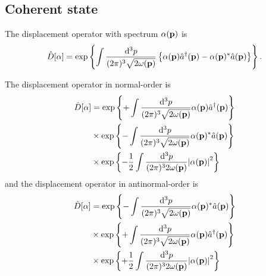 \subsection{Coherent state}

\begin{definition}
	The displacement operator with spectrum $\alpha(\vb{p})$ is
	\begin{equation}
		\hat{D}[\alpha]
		=
		\exp\left\{
			\int\frac{\dd[3]{p}}{(2\pi)^3\sqrt{2\omega(\vb{p})}}
			\left\{
				\alpha(\vb{p})
				\hat{a}^\dagger(\vb{p})
				-
				\alpha(\vb{p})^*
				\hat{a}(\vb{p})
			\right\}
		\right\}
		\label{eq:displacement_operator}
		.
	\end{equation}
\end{definition}
\begin{lemma}\label{thm:displacement_operator_normal_ordered}
	The displacement operator in normal-order is
	\begin{equation}
		\begin{split}
			\hat{D}[\alpha]
			&=
			\exp\left\{
				+
				\int\frac{\dd[3]{p}}{(2\pi)^3\sqrt{2\omega(\vb{p})}}
				\alpha(\vb{p})
				\hat{a}^\dagger(\vb{p})
			\right\}
			\\
			&\times
			\exp\left\{
				-
				\int\frac{\dd[3]{p}}{(2\pi)^3\sqrt{2\omega(\vb{p})}}
				\alpha(\vb{p})^*
				\hat{a}(\vb{p})
			\right\}
			\\
			&\times
			\exp\left\{
				-
				\frac{1}{2}
				\int\frac{\dd[3]{p}}{(2\pi)^32\omega(\vb{p})}
				\abs{\alpha(\vb{p})}^2
			\right\}
		\end{split}
		\label{eq:displacement_operator_normal}
	\end{equation}
	and the displacement operator in antinormal-order is
	\begin{equation}
		\begin{split}
			\hat{D}[\alpha]
			&=
			\exp\left\{
				-
				\int\frac{\dd[3]{p}}{(2\pi)^3\sqrt{2\omega(\vb{p})}}
				\alpha(\vb{p})^*
				\hat{a}(\vb{p})
			\right\}
			\\
			&\times
			\exp\left\{
				+
				\int\frac{\dd[3]{p}}{(2\pi)^3\sqrt{2\omega(\vb{p})}}
				\alpha(\vb{p})
				\hat{a}^\dagger(\vb{p})
			\right\}
			\\
			&\times
			\exp\left\{
				+
				\frac{1}{2}
				\int\frac{\dd[3]{p}}{(2\pi)^32\omega(\vb{p})}
				\abs{\alpha(\vb{p})}^2
			\right\}
		\end{split}
		\label{eq:displacement_operator_antinormal}
	\end{equation}
\end{lemma}
